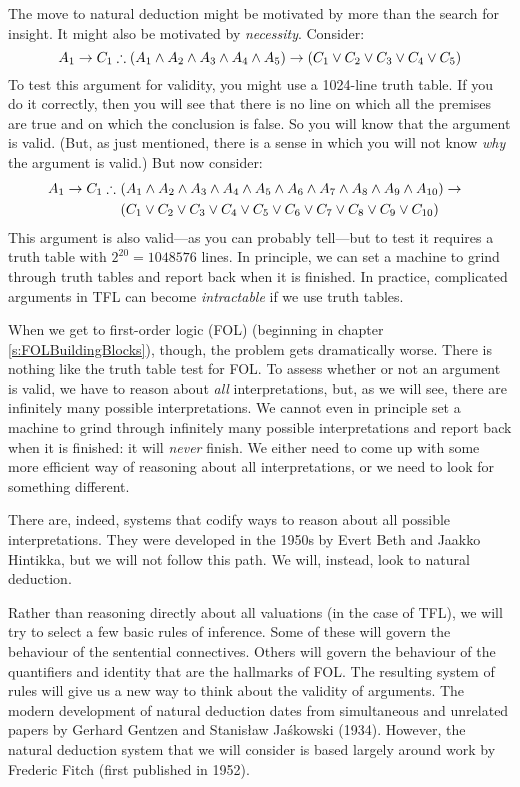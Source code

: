 The move to natural deduction might be motivated by more than the search for insight. It might also be motivated by \emph{necessity}. Consider:
$$A_1 \eif C_1 \therefore (A_1 \eand A_2 \eand A_3 \eand A_4 \eand A_5) \eif (C_1 \eor C_2 \eor C_3 \eor C_4 \eor C_5)$$
To test this argument for validity, you might use a 1024-line truth table. If you do it correctly, then you will see that there is no line on which all the premises are true and on which the conclusion is false. So you will know that the argument is valid. (But, as just mentioned, there is a sense in which you will not know \emph{why} the argument is valid.) But now consider:
\begin{align*}
A_1 \eif C_1 \therefore\ & (A_1 \eand A_2 \eand A_3 \eand A_4 \eand A_5 \eand A_6 \eand A_7 \eand A_8 \eand A_9 \eand A_{10}) \eif \phantom{(}\\
&(C_1 \eor C_2 \eor C_3 \eor C_4 \eor C_5 \eor C_6 \eor C_7 \eor C_8 \eor C_9 \eor C_{10})
\end{align*}
This argument is also valid---as you can probably tell---but to test it requires a truth table with $2^{20} = 1048576$ lines. In principle, we can set a machine to grind through truth tables and report back when it is finished. In practice, complicated arguments in TFL can become \emph{intractable} if we use truth tables.

When we get to first-order logic (FOL) (beginning in chapter \ref{s:FOLBuildingBlocks}), though, the problem gets dramatically worse. There is nothing like the truth table test for FOL. To assess whether or not an argument is valid, we have to reason about \emph{all} interpretations, but, as we will see, there are infinitely many possible interpretations. We cannot even in principle set a machine to grind through infinitely many possible interpretations and report back when it is finished: it will \emph{never} finish. We either need to come up with some more efficient way of reasoning about all interpretations, or we need to look for something different. 

There are, indeed, systems that codify ways to reason about all possible interpretations. They were developed in the 1950s by Evert Beth and Jaakko Hintikka, but we will not follow this path. We will, instead, look to natural deduction. 

Rather than reasoning directly about all valuations (in the case of TFL), we will try to select a few basic rules of inference. Some of these will govern the behaviour of the sentential connectives. Others will govern the behaviour of the quantifiers and identity that are the hallmarks of FOL. The resulting system of rules will give us a new way to think about the validity of arguments. 
The modern development of natural deduction dates from simultaneous and unrelated papers by Gerhard Gentzen and Stanis\l{}aw Ja\'{s}kowski (1934). However, the natural deduction system that we will consider is based largely around work by Frederic Fitch (first published in 1952). 



